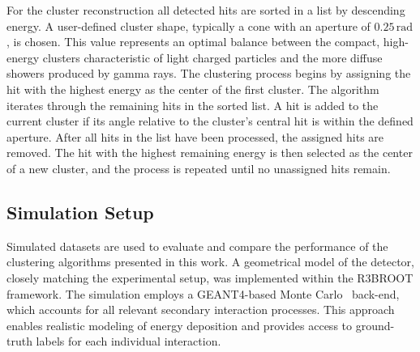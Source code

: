 \documentclass[review,sort&compress]{elsarticle}
\begin{document}
For the cluster reconstruction all detected hits are sorted in a list by descending energy. A user-defined cluster shape, typically a cone with an aperture of $0.25\,\mathrm{rad}$, is chosen. This value represents an optimal balance between the compact, high-energy clusters characteristic of light charged particles and the more diffuse showers produced by gamma rays.\newline 
The clustering process begins by assigning the hit with the highest energy as the center of the first cluster. The algorithm iterates through the remaining hits in the sorted list. A hit is added to the current cluster if its angle relative to the cluster's central hit is within the defined aperture. After all hits in the list have been processed, the assigned hits are removed. The hit with the highest remaining energy is then selected as the center of a new cluster, and the process is repeated until no unassigned hits remain.\newline

\subsection{Simulation Setup}\label{s_sec:data_sim}
Simulated datasets are used to evaluate and compare the performance of the clustering algorithms presented in this work.
A geometrical model of the detector, closely matching the experimental setup, was implemented within the R3BROOT framework. The simulation employs a GEANT4-based Monte Carlo~\cite{agostinelli2003geant4} back-end, which accounts for all relevant secondary interaction processes. This approach enables realistic modeling of energy deposition and provides access to ground-truth labels for each individual interaction.\newline
\end{document}

